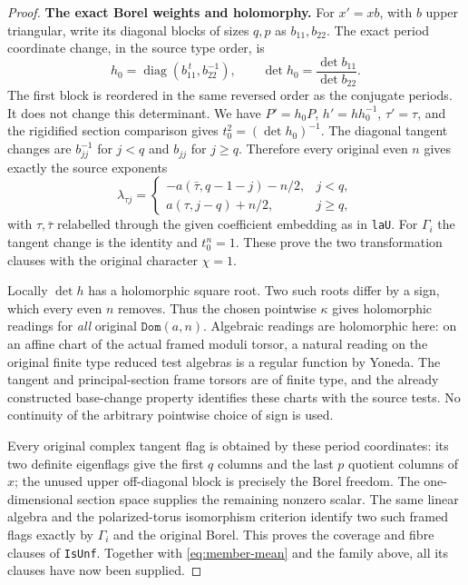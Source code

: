 \begin{proof}
\par\medskip\noindent\textbf{The exact Borel weights and holomorphy.}
For $x'=xb$, with $b$ upper triangular, write its diagonal
blocks of sizes $q,p$ as $b_{11},b_{22}$.  The exact period
coordinate change, in the source type order, is
\[
        h_0=\operatorname{diag}(b_{11}^{\,t},b_{22}^{-1}),
 \qquad \det h_0=\frac{\det b_{11}}{\det b_{22}}.
\]
The first block is reordered in the same reversed order as
the conjugate periods.  It does not change this determinant.
We have $P'=h_0P$, $h'=hh_0^{-1}$, $\tau'=\tau$, and the
rigidified section comparison gives
$t_0^2=(\det h_0)^{-1}$.
The diagonal tangent changes are $b_{jj}^{-1}$ for $j<q$
and $b_{jj}$ for $j\ge q$.  Therefore every original even
$n$ gives exactly the source exponents
\[
 \lambda_{\tau j}=
 \begin{cases}
  -a(\bar\tau,q-1-j)-n/2,&j<q,\\
   a(\tau,j-q)+n/2,&j\ge q ,
 \end{cases}
\]
with $\tau,\bar\tau$ relabelled through the given coefficient
embedding as in \texttt{laU}.  For $\Gamma_i$ the tangent
change is the identity and $t_0^n=1$.  These prove the two
transformation clauses with the original character $\chi=1$.

Locally $\det h$ has a holomorphic square root.  Two such
roots differ by a sign, which every even $n$ removes.
Thus the chosen pointwise $\kappa$ gives holomorphic readings
for \emph{all} original $\texttt{Dom}(a,n)$.
Algebraic readings are holomorphic here: on an affine chart
of the actual framed moduli torsor, a natural reading on the
original finite type reduced test algebras is a regular function
by Yoneda.  The tangent and principal-section frame torsors are
of finite type, and the already constructed base-change
property identifies these charts with the source tests.
No continuity of the arbitrary pointwise choice of sign is used.

Every original complex tangent flag is obtained by these
period coordinates: its two definite eigenflags give the
first $q$ columns and the last $p$ quotient columns of $x$;
the unused upper off-diagonal block is precisely the Borel
freedom.  The one-dimensional section space supplies the
remaining nonzero scalar.  The same linear algebra and the
polarized-torus isomorphism criterion identify two such
framed flags exactly by $\Gamma_i$ and the original Borel.
This proves the coverage and fibre clauses of \texttt{IsUnf}.
Together with \eqref{eq:member-mean} and the family above,
all its clauses have now been supplied.


\end{proof}
